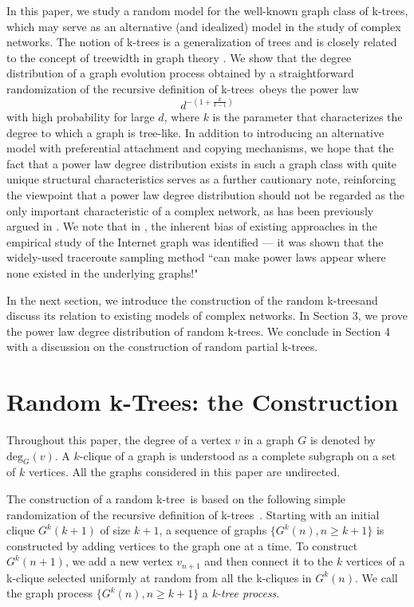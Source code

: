 \documentclass[11pt]{article}
\providecommand{\degree}[2]{{\textrm{deg}_{#1}(#2)}}
\providecommand{\rktree}[2]{G^{#1}(#2)}
\providecommand{\ktree}{k-tree}
\providecommand{\ktrees}{k-trees}
\begin{document}
In this paper, we study a random model for the well-known graph class of \ktrees,
which may serve as an alternative (and idealized) model in the study of complex networks.
The notion of k-trees is a generalization of trees and is closely related to the concept of treewidth in graph theory \cite{kloks94}.
We show that the degree distribution of a graph evolution process obtained by a straightforward randomization of the recursive definition of \ktrees\ obeys the power law
$$
d^{-(1 + \frac{k}{k-1})}
$$
with high probability for large $d$, where $k$ is the parameter that characterizes the degree to which a graph is tree-like.
In addition to introducing an alternative model with preferential attachment and copying mechanisms, we hope that
the fact that a power law degree distribution exists in such a graph class with quite unique structural characteristics
serves as a further cautionary note, reinforcing the viewpoint that a power law degree distribution should not be regarded as
the only important characteristic of a complex network, as has been previously argued in \cite{li05,mitzenmacher05}. We note that in \cite{dimitris05power}, 
the inherent bias of existing approaches in the empirical study of 
the Internet graph was identified --- it was shown that the widely-used 
traceroute sampling method ``can make power laws appear where none existed in
the underlying graphs!" 






In the next section, we introduce the construction of the random \ktrees and discuss its relation to existing models of complex networks.
In Section 3, we prove the power law degree distribution of random \ktrees.
We conclude in Section 4 
with a discussion on the construction of random partial \ktrees.


\section{Random k-Trees: the Construction}

Throughout this paper, the degree of a vertex $v$ in a graph $G$ is denoted by $\degree{G}{v}$.  A $k$-clique of a graph is understood as a complete subgraph on a set of $k$ vertices. All the graphs considered in this paper are undirected. 


The construction of a random \ktree\ is based on the following simple randomization of the recursive definition of \ktrees\ \cite{kloks94}.
Starting with an initial clique $\rktree{k}{k + 1}$ of size $k + 1$, a sequence of graphs $\{\rktree{k}{n}, n \geq k + 1\}$ is constructed by adding vertices to the graph one at a time.
To construct $\rktree{k}{n + 1}$, we add a new vertex $v_{n + 1}$ and then connect it to the $k$ vertices of a k-clique selected
uniformly at random from all the k-cliques in $\rktree{k}{n}$.
We call the graph process $\{\rktree{k}{n}, n \geq k + 1\}$ a \textit{k-tree process}.
\end{document}

